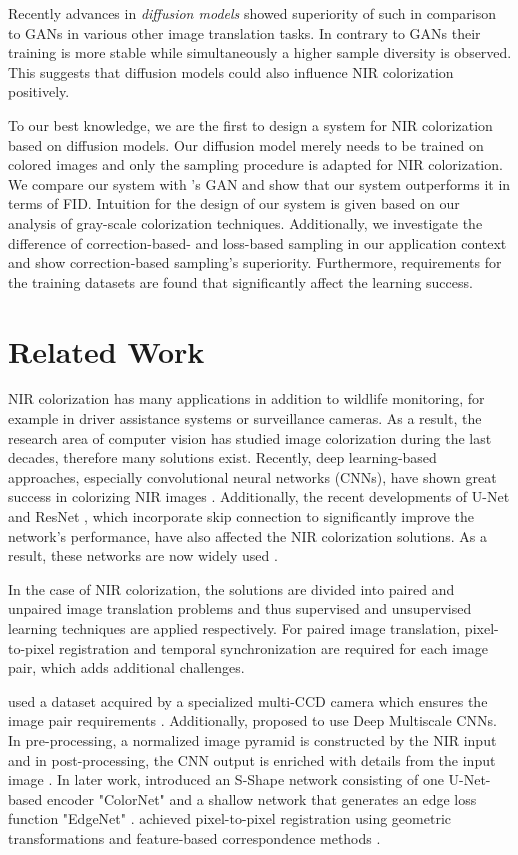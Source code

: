 Recently advances in \textit{diffusion models} showed superiority of such in comparison to GANs in various other image translation tasks.
In contrary to GANs their training is more stable while simultaneously a higher sample diversity is observed.
This suggests that diffusion models could also influence NIR colorization positively.

To our best knowledge, we are the first to design a system for NIR colorization based on diffusion models.
Our diffusion model merely needs to be trained on colored images and only the sampling procedure is adapted for NIR colorization.
We compare our system with 's GAN and show that our system outperforms it in terms of FID.
Intuition for the design of our system is given based on our analysis of gray-scale colorization techniques.
Additionally, we investigate the difference of correction-based- and loss-based sampling in our application
context and show correction-based sampling's superiority.
Furthermore, requirements for the training datasets are found that significantly affect the learning success.

\section{Related Work}
NIR colorization has many applications in addition to wildlife monitoring, for example in driver assistance systems or surveillance cameras.
As a result, the research area of computer vision has studied image colorization during the last decades, therefore many solutions exist.
Recently, deep learning-based approaches, especially convolutional neural networks (CNNs), have shown great success in colorizing NIR images \parencite{limmer}.
Additionally, the recent developments of U-Net \parencite{unet} and ResNet \parencite{resnet}, which incorporate skip connection to significantly improve the network's performance, have also affected
the NIR colorization solutions. As a result, these networks are now widely used \parencite{cyclegan-original,mehri,cut,s-shape}.

In the case of NIR colorization, the solutions are divided into paired and unpaired image translation problems and thus supervised and unsupervised learning techniques are applied respectively.
For paired image translation, pixel-to-pixel registration and temporal synchronization are required for each image pair, which adds additional challenges.

 used a dataset acquired by a specialized multi-CCD camera which ensures the image pair requirements \parencite{limmer}.
Additionally,  proposed to use Deep Multiscale CNNs.
In pre-processing, a normalized image pyramid is constructed by the NIR input and in post-processing, the CNN output is enriched with details from the input image \parencite{limmer}.
In later work,  introduced an S-Shape network consisting of one U-Net-based encoder "ColorNet" and a shallow network that generates an edge loss function "EdgeNet" \parencite{s-shape}.
 achieved pixel-to-pixel registration using geometric transformations and feature-based correspondence methods \parencite{s-shape}.


